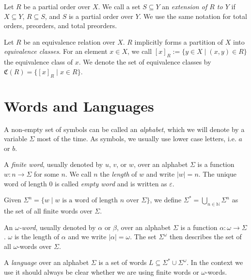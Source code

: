 \begin{defn}
	Let $R$ be a partial order over $X$. We call a set $S \subseteq Y$ an \emph{extension of $R$ to $Y$} if $X \subseteq Y$, $R \subseteq S$, and $S$ is a partial order over $Y$. We use the same notation for total orders, preorders, and total preorders.
\end{defn}

\begin{defn}
	Let $R$ be an equivalence relation over $X$. $R$ implicitly forms a partition of $X$ into \emph{equivalence classes}. For an element $x \in X$, we call $[x]_R := \{ y \in X \mid (x, y) \in R \}$ the equivalence class of $x$. We denote the set of equivalence classes by $\mathfrak{C}(R) = \{ [x]_R \mid x \in R \}$.
\end{defn}





\section{Words and Languages}
\begin{defn}
	A non-empty set of symbols can be called an \emph{alphabet}, which we will denote by a variable $\Sigma$ most of the time. As symbols, we usually use lower case letters, i.e. $a$ or $b$.
	
	A \emph{finite word}, usually denoted by $u$, $v$, or $w$, over an alphabet $\Sigma$ is a function $w : n \rightarrow \Sigma$ for some $n$. We call $n$ the \emph{length} of $w$ and write $|w| = n$. The unique word of length $0$ is called \emph{empty word} and is written as $\varepsilon$.
	
	Given $\Sigma^n = \{ w \mid w \text{ is a word of length } n \text{ over } \Sigma \}$, we define $\Sigma^* = \bigcup\limits_{n \in \mathbb{N}} \Sigma^n$ as the set of all finite words over $\Sigma$. 
\end{defn}

\begin{defn}
	An \emph{$\omega$-word}, usually denoted by $\alpha$ or $\beta$, over an alphabet $\Sigma$ is a function $\alpha : \omega \rightarrow \Sigma$. $\omega$ is the length of $\alpha$ and we write $|\alpha| = \omega$. The set $\Sigma^\omega$ then describes the set of all $\omega$-words over $\Sigma$. 
\end{defn}

\begin{defn}
	A \emph{language} over an alphabet $\Sigma$ is a set of words $L \subseteq \Sigma^* \cup \Sigma^\omega$. In the context we use it should always be clear whether we are using finite words or $\omega$-words.
\end{defn}

